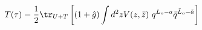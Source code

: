 \begin{equation}
T(\tau)=\frac{1}{2}\tr_{U+T} \left[\left( 1+\hat g\right)
\int d^2z V(z,\bar z)\  q^{L_o-a}\bar q^{\tilde L_o-\tilde a}\right]
\end{equation}

